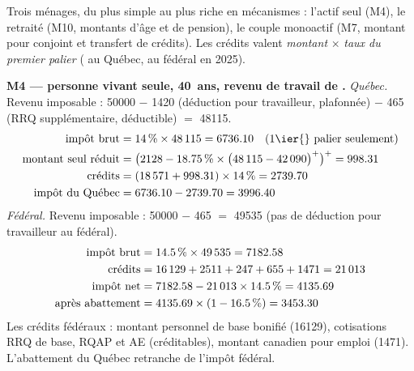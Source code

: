 \pexemples Trois ménages, du plus simple au plus riche en mécanismes : l'actif seul
(M4), le retraité (M10, montants d'âge et de pension), le couple monoactif
(M7, montant pour conjoint et transfert de crédits). Les crédits valent
\emph{montant} $\times$ \emph{taux du premier palier} ( au
Québec,  au fédéral en 2025).

\medskip\noindent\textbf{M4 --- personne vivant seule, 40~ans, revenu de travail de .}
\emph{Québec.} Revenu imposable : \num{50000} $-$ \num{1420}
(déduction pour travailleur, plafonnée) $-$ \num{465} (RRQ
supplémentaire, déductible) $=$ \num{48115}.
\begin{align*}
\text{impôt brut} &= \pc{14} \times \num{48115} = \num{6736.10} \quad (\text{1\ier{} palier seulement}) \\
\text{montant seul réduit} &= \pos{\num{2128} - \pc{18.75} \times \pos{\num{48115} - \num{42090}}} = \num{998.31} \\
\text{crédits} &= (\num{18571} + \num{998.31}) \times \pc{14} = \num{2739.70} \\
\text{impôt du Québec} &= \num{6736.10} - \num{2739.70} = \num{3996.40}
\end{align*}
\emph{Fédéral.} Revenu imposable : \num{50000} $-$ \num{465}
$=$ \num{49535} (pas de déduction pour travailleur au fédéral).
\begin{align*}
\text{impôt brut} &= \num{14.5}\,\% \times \num{49535} = \num{7182.58} \\
\text{crédits} &= \num{16129} + \num{2511} + \num{247} + \num{655} + \num{1471} = \num{21013} \\
\text{impôt net} &= \num{7182.58} - \num{21013} \times \num{14.5}\,\% = \num{4135.69} \\
\text{après abattement} &= \num{4135.69} \times (1 - \num{16.5}\,\%) = \num{3453.30}
\end{align*}
Les crédits fédéraux : montant personnel de base bonifié (\num{16129}),
cotisations RRQ de base, RQAP et AE (créditables), montant canadien pour
emploi (\num{1471}). L'abattement du Québec retranche
 de l'impôt fédéral.

